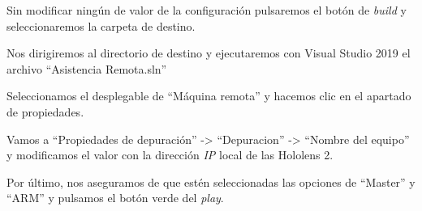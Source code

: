 
Sin modificar ningún de valor de la configuración pulsaremos el botón de \textit{build} y seleccionaremos la carpeta de destino.


Nos dirigiremos al directorio de destino y ejecutaremos con Visual Studio 2019 el archivo “Asistencia Remota.sln”


Seleccionamos el desplegable de “Máquina remota” y hacemos clic en el apartado de propiedades.


Vamos a “Propiedades de depuración” -> “Depuracion” -> “Nombre del equipo” y modificamos el valor con la dirección \textit{IP} local de las Hololens 2.

Por último, nos aseguramos de que estén seleccionadas las opciones de “Master” y “ARM” y pulsamos el botón verde del \textit{play}.


